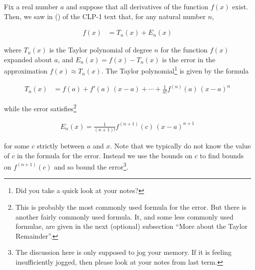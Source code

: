 Fix a real number $a$ and suppose that all derivatives of the function $f(x)$ exist. Then, we saw in () of the CLP-1 text that, for any natural number $n$,
\begin{impeqn}\label{eq:TaylorPolyPlusError}
\begin{align*}
f(x) &=T_n(x) +E_n(x)
\end{align*}
\end{impeqn}
\noindent where $T_n(x)$ is the Taylor polynomial of degree $n$
for the function $f(x)$ expanded about $a$, and  $E_n(x)=f(x)-T_n(x)$
is the error in the approximation $f(x) \approx T_n(x)$. 
The Taylor polynomial\footnote{Did you
take a quick look at your notes?} is given by the formula
%
\resetimpsubeqn %
\begin{impsubeqn}\label{eq:TaylorPolyPlusError_a}
\begin{align*}
T_n(x)&=f(a)+f'(a)\,(x-a)+\cdots+\tfrac{1}{n!}f^{(n)}(a)\, (x-a)^n
\end{align*}
\end{impsubeqn}
\noindent while the error satisfies\footnote{This is probably the most commonly used formula for the error. But there is another fairly commonly used formula.  It, and some less commonly used formulae, are given in the next (optional) subsection ``More about the Taylor Remainder''.}
\begin{impsubeqn}\label{eq:TaylorPolyPlusError_b}
\begin{align*}
E_n(x)=\tfrac{1}{(n+1)!}f^{(n+1)}(c)\, (x-a)^{n+1}
\end{align*}
\end{impsubeqn}
\noindent for some $c$ strictly between $a$ and $x$. Note that we typically
do not know the value of $c$ in the formula for the error.
Instead we use the bounds on $c$ to find bounds on $f^{(n+1)}(c)$ and
so bound the error\footnote{The discussion here is only supposed to
jog your memory. If it is feeling insufficiently jogged, then
please look at your notes from last term.}.

